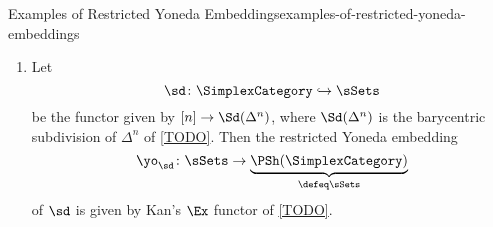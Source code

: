 \begin{example}{Examples of Restricted Yoneda Embeddings}{examples-of-restricted-yoneda-embeddings}
\begin{enumerate}
            \[
                \yo_{\iota}%
                \colon%
                \sCats%
                \to%
                \underbrace{\PSh(\SimplexCategory)}_{\defeq\sSets}%
            \]%
            of $\iota$ is given by the coherent nerve functor $\sNerveB$ of .
        \item\label{examples-of-restricted-yoneda-embeddings-kan-s-ex-functor}Let
            \[
                \sd%
                \colon%
                \SimplexCategory%
                \hookrightarrow%
                \sSets%
            \]%
            be the functor given by $[n]\to\Sd(\Delta^{n})$, where $\Sd(\Delta^{n})$ is the barycentric subdivision of $\Delta^{n}$ of \cref{TODO}. Then the restricted Yoneda embedding
            \[
                \yo_{\sd}%
                \colon%
                \sSets%
                \to%
                \underbrace{\PSh(\SimplexCategory)}_{\defeq\sSets}%
            \]%
            of $\sd$ is given by Kan's $\Ex$ functor of \cref{TODO}.
    \end{enumerate}
\end{example}
